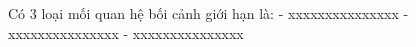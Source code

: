 Có  3 loại  mối quan hệ bối cảnh giới hạn   là:
- xxxxxxxxxxxxxxx
- xxxxxxxxxxxxxxx
- xxxxxxxxxxxxxxx  